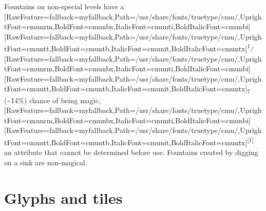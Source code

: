 Fountains on non-{}special levels\footnotemark[31] have a \allowbreak{}\setmainfont{cmunrm.ttf}[RawFeature={fallback=myfallback},Path=/usr/share/fonts/truetype/cmu/,UprightFont=cmunrm,BoldFont=cmunbx,ItalicFont=cmunti,BoldItalicFont=cmunbi]\setmonofont{cmunrm.ttf}[RawFeature={fallback=myfallback},Path=/usr/share/fonts/truetype/cmu/,UprightFont=cmuntt,BoldFont=cmuntb,ItalicFont=cmunit,BoldItalicFont=cmuntx]\textsuperscript{1}⁄\allowbreak{}\setmainfont{cmunrm.ttf}[RawFeature={fallback=myfallback},Path=/usr/share/fonts/truetype/cmu/,UprightFont=cmunrm,BoldFont=cmunbx,ItalicFont=cmunti,BoldItalicFont=cmunbi]\setmonofont{cmunrm.ttf}[RawFeature={fallback=myfallback},Path=/usr/share/fonts/truetype/cmu/,UprightFont=cmuntt,BoldFont=cmuntb,ItalicFont=cmunit,BoldItalicFont=cmuntx]\textsubscript{7} (\~{}14\%) chance of being magic,\allowbreak{}\setmainfont{cmunrm.ttf}[RawFeature={fallback=myfallback},Path=/usr/share/fonts/truetype/cmu/,UprightFont=cmunrm,BoldFont=cmunbx,ItalicFont=cmunti,BoldItalicFont=cmunbi]\setmonofont{cmunrm.ttf}[RawFeature={fallback=myfallback},Path=/usr/share/fonts/truetype/cmu/,UprightFont=cmuntt,BoldFont=cmuntb,ItalicFont=cmunit,BoldItalicFont=cmuntx]\textsuperscript{{$\text{[}$}1{$\text{]}$}} an attribute that cannot be determined before use. Fountains created by digging\footnotemark[32] on a sink\footnotemark[33] are non-{}magical.





\section{Glyphs and tiles}
\label{1}

